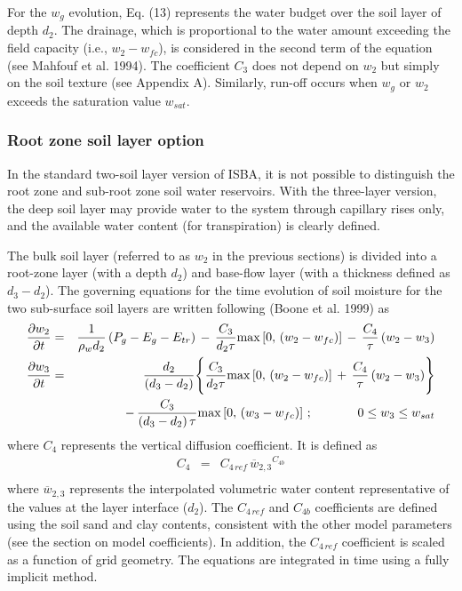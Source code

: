 For the $w_g$ evolution,
Eq. (13) represents the water budget over the soil
layer of depth $d_2$.  The drainage, which is proportional to the water
amount exceeding the field capacity (i.e., $w_2-w_{fc}$),
is considered in the second term of the equation (see
Mahfouf et al. 1994).  The coefficient $C_3$ does not depend
on $w_2$ but simply on the soil texture (see Appendix A).  Similarly,
run-off occurs when $w_g$ or $w_2$ exceeds the saturation
value $w_{sat}$.

\subsubsection{Root zone soil layer option}

In the standard two-soil layer version of ISBA, it is not possible
to distinguish the root zone and sub-root zone soil water reservoirs.
With the three-layer version,
the deep soil layer may provide water
to the system through capillary rises only, and the available
water content (for transpiration) is clearly defined.

The bulk soil layer (referred to as $w_2$ in the previous sections)
is divided into a root-zone layer (with a depth $d_2$) and base-flow layer
(with a thickness defined as $d_3-d_2$).
The governing equations for the time evolution of
soil moisture for the two sub-surface soil layers are written
following (Boone et al. 1999) as
%
\begin{eqnarray}
%
{\partial w_2\over\partial t} &=&
{1\over \rho_w d_2}\left(P_g-E_g-E_{tr}\right)
\,-\, {C_3\over d_2\tau} {\rm max}\left[0,\,\left(w_2-w_{fc}\right)\right]
\,-\, {C_4\over\tau} \left(w_2-w_3\right) \\
%
{\partial w_3\over\partial t} &=&
{d_2\over \left(d_3-d_2\right)}
\Biggr\lbrace
{C_3\over d_2\tau} {\rm max}\left[0,\,\left(w_2-w_{fc}\right)\right]
\,+\, {C_4\over\tau} \left(w_2-w_3\right)
\Biggr\rbrace \\
& & \,-\,
{C_3\over \left(d_3-d_2\right)\tau}
{\rm max}\left[0,\,\left(w_3-w_{fc}\right)\right] \,;
\hskip.5in 0 \leq w_3 \leq w_{sat}
%
\end{eqnarray}
%
where $C_4$ represents the vertical diffusion coefficient.
It is defined as
%
\begin{eqnarray}
%
C_4 & =& {C_{4\, ref}} \,{{\overline w}_{2,3}}^{C_{4b}} \\
%
\end{eqnarray}
%
where ${\overline w_{2,3}}$ represents the interpolated volumetric water
content representative of the values at the layer interface ($d_2$).
The $C_{4\, ref}$ and $C_{4b}$ coefficients are defined using the soil
sand and clay contents, consistent with the
other model parameters (see the section on model coefficients). In addition,
the $C_{4\, ref}$ coefficient is scaled as a function of grid geometry.
The equations are integrated in time using a fully implicit method.


